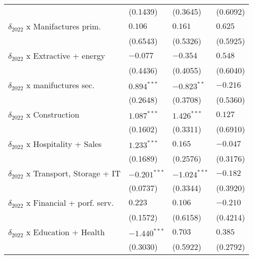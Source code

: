 \begin{tabular}{llll}
                                                   &           (0.1439) &           (0.3645) &           (0.6092) \\
$\delta_{2022}$ x Manifactures prim.               &            $0.106$ &            $0.161$ &            $0.625$ \\
                                                   &           (0.6543) &           (0.5326) &           (0.5925) \\
$\delta_{2022}$ x Extractive + energy              &           $-0.077$ &           $-0.354$ &            $0.548$ \\
                                                   &           (0.4436) &           (0.4055) &           (0.6040) \\
$\delta_{2022}$ x manifuctures sec.                &      $0.894^{***}$ &      $-0.823^{**}$ &           $-0.216$ \\
                                                   &           (0.2648) &           (0.3708) &           (0.5360) \\
$\delta_{2022}$ x Construction                     &      $1.087^{***}$ &      $1.426^{***}$ &            $0.127$ \\
                                                   &           (0.1602) &           (0.3311) &           (0.6910) \\
$\delta_{2022}$ x Hospitality + Sales              &      $1.233^{***}$ &            $0.165$ &           $-0.047$ \\
                                                   &           (0.1689) &           (0.2576) &           (0.3176) \\
$\delta_{2022}$ x Transport, Storage + IT          &     $-0.201^{***}$ &     $-1.024^{***}$ &           $-0.182$ \\
                                                   &           (0.0737) &           (0.3344) &           (0.3920) \\
$\delta_{2022}$ x Financial + porf. serv.          &            $0.223$ &            $0.106$ &           $-0.210$ \\
                                                   &           (0.1572) &           (0.6158) &           (0.4214) \\
$\delta_{2022}$ x Education + Health               &     $-1.440^{***}$ &            $0.703$ &            $0.385$ \\
                                                   &           (0.3030) &           (0.5922) &           (0.2792) \\

\end{tabular}
